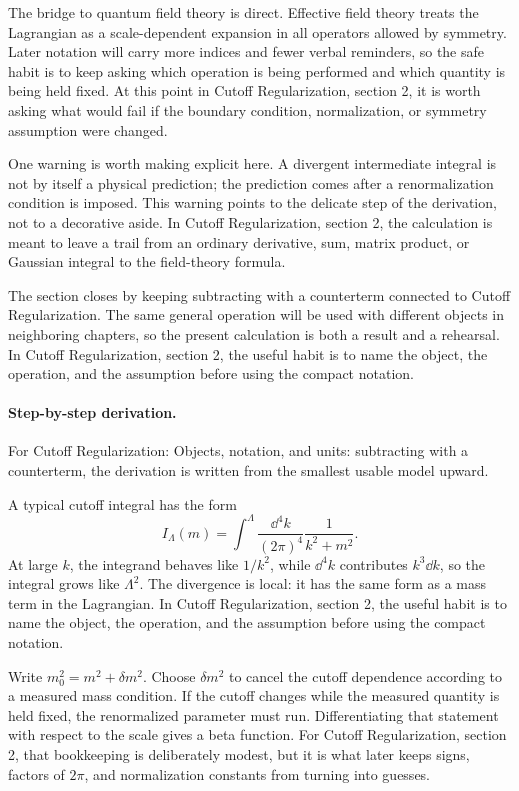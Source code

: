 The bridge to quantum field theory is direct.  Effective field theory treats the Lagrangian as a scale-dependent expansion in all operators allowed by symmetry.  Later notation will carry more indices and fewer verbal reminders, so the safe habit is to keep asking which operation is being performed and which quantity is being held fixed.  At this point in Cutoff Regularization, section 2, it is worth asking what would fail if the boundary condition, normalization, or symmetry assumption were changed.

One warning is worth making explicit here.  A divergent intermediate integral is not by itself a physical prediction; the prediction comes after a renormalization condition is imposed.  This warning points to the delicate step of the derivation, not to a decorative aside.  In Cutoff Regularization, section 2, the calculation is meant to leave a trail from an ordinary derivative, sum, matrix product, or Gaussian integral to the field-theory formula.

The section closes by keeping subtracting with a counterterm connected to Cutoff Regularization.  The same general operation will be used with different objects in neighboring chapters, so the present calculation is both a result and a rehearsal.  In Cutoff Regularization, section 2, the useful habit is to name the object, the operation, and the assumption before using the compact notation.



\paragraph{Step-by-step derivation.}

For Cutoff Regularization: Objects, notation, and units: subtracting with a counterterm, the derivation is written from the smallest usable model upward.

A typical cutoff integral has the form
\[
  I_\Lambda(m)=\int^{\Lambda}\frac{\dd^4k}{(2\pi)^4}\frac{1}{k^2+m^2}.
\]
At large \(k\), the integrand behaves like \(1/k^2\), while \(\dd^4k\) contributes \(k^3\dd k\), so the integral grows like \(\Lambda^2\).  The divergence is local: it has the same form as a mass term in the Lagrangian.  In Cutoff Regularization, section 2, the useful habit is to name the object, the operation, and the assumption before using the compact notation.

Write \(m_0^2=m^2+\delta m^2\).  Choose \(\delta m^2\) to cancel the cutoff dependence according to a measured mass condition.  If the cutoff changes while the measured quantity is held fixed, the renormalized parameter must run.  Differentiating that statement with respect to the scale gives a beta function.  For Cutoff Regularization, section 2, that bookkeeping is deliberately modest, but it is what later keeps signs, factors of \(2\pi\), and normalization constants from turning into guesses.

